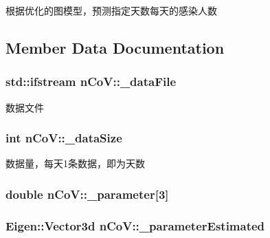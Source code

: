 根据优化的图模型，预测指定天数每天的感染人数 



\subsection{Member Data Documentation}
\subsubsection[{\texorpdfstring{\+\_\+data\+File}{_dataFile}}]{\setlength{\rightskip}{0pt plus 5cm}std\+::ifstream n\+Co\+V\+::\+\_\+data\+File\hspace{0.3cm}{\ttfamily [private]}}\hypertarget{classnCoV_a9585e58cac7c3c4cf26fe0291b809f06}{}\label{classnCoV_a9585e58cac7c3c4cf26fe0291b809f06}


数据文件 

\subsubsection[{\texorpdfstring{\+\_\+data\+Size}{_dataSize}}]{\setlength{\rightskip}{0pt plus 5cm}int n\+Co\+V\+::\+\_\+data\+Size\hspace{0.3cm}{\ttfamily [private]}}\hypertarget{classnCoV_a7182f86ff0f0f607cd461ebe738fb9da}{}\label{classnCoV_a7182f86ff0f0f607cd461ebe738fb9da}


数据量，每天1条数据，即为天数 

\subsubsection[{\texorpdfstring{\+\_\+parameter}{_parameter}}]{\setlength{\rightskip}{0pt plus 5cm}double n\+Co\+V\+::\+\_\+parameter\mbox{[}3\mbox{]}\hspace{0.3cm}{\ttfamily [private]}}\hypertarget{classnCoV_ae34cb58fd08703599158b69853b659a2}{}\label{classnCoV_ae34cb58fd08703599158b69853b659a2}
\subsubsection[{\texorpdfstring{\+\_\+parameter\+Estimated}{_parameterEstimated}}]{\setlength{\rightskip}{0pt plus 5cm}Eigen\+::\+Vector3d n\+Co\+V\+::\+\_\+parameter\+Estimated\hspace{0.3cm}{\ttfamily [private]}}\hypertarget{classnCoV_a6980bf4492a8ce437b15ac9625eacfce}{}\label{classnCoV_a6980bf4492a8ce437b15ac9625eacfce}

